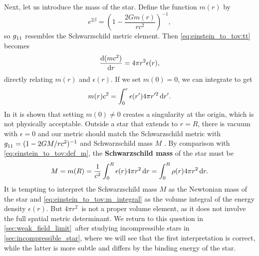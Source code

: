Next, let us introduce the mass of the star.
Define the function $m(r)$ by
\begin{equation}
	e^{2 \beta} = \left( 1 - \frac{2 G m(r)}{r c^2} \right)^{-1} ,
	\label{eq:einstein_to_tov:def_m}
\end{equation}
so $g\indices{_1_1}$ resembles the Schwarzschild metric element.
Then \cref{eq:einstein_to_tov:tt} becomes
\begin{equation}
	\odv{(m c^2)}{r} = 4 \pi r^2 \epsilon(r) ,
	\label{eq:einstein_to_tov:m_rho}
\end{equation}
directly relating $m(r)$ and $\epsilon(r)$.
If we set $m(0) = 0$, we can integrate to get
\begin{equation}
	m(r) c^2 = \integral{\epsilon(r') 4 \pi r'^2}{r'}{0}{r} .
	\label{eq:einstein_to_tov:m_integral}
\end{equation}
In \cite[page 602]{ref:mtw} it is shown that setting $m(0) \neq 0$ creates a singularity at the origin, which is not physically acceptable.
Outside a star that extends to $r = R$, there is vacuum with $\epsilon = 0$ and our metric should match the Schwarzschild metric with $g\indices{_1_1} = (1-2GM/rc^2)^{-1}$ and Schwarzschild mass $M$ \cite[equation 5.1]{ref:carroll}.
By comparison with \cref{eq:einstein_to_tov:def_m}, the \textbf{Schwarzschild mass} of the star must be
\begin{equation}
	M = m(R) = \frac{1}{c^2} \integral{\epsilon(r) 4 \pi r^2}{r}{0}{R} = \integral{\rho(r) 4 \pi r^2}{r}{0}{R}.
	\label{eq:einstein_to_tov:schwarzschild_mass}
\end{equation}
It is tempting to interpret the Schwarzschild mass $M$ as the Newtonian mass of the star and \eqref{eq:einstein_to_tov:m_integral} as the volume integral of the energy density $\epsilon(r)$.
But $4 \pi r^2$ is not a proper volume element, as it does not involve the full spatial metric determinant.
We return to this question in \cref{sec:weak_field_limit} after studying incompressible stars in \cref{sec:incompressible_star}, where we will see that the first interpretation is correct, while the latter is more subtle and differs by the binding energy of the star.

